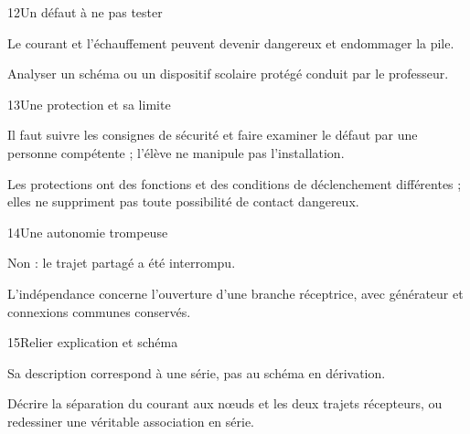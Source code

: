 \par\noindent\begin{minipage}{\linewidth}
\begin{corrige}{12}{Un défaut à ne pas tester}
\begin{questions}
\item Le courant et l’échauffement peuvent devenir dangereux et endommager la pile.
\item Analyser un schéma ou un dispositif scolaire protégé conduit par le professeur.
\end{questions}
\end{corrige}
\end{minipage}
\par\noindent\begin{minipage}{\linewidth}
\begin{corrige}{13}{Une protection et sa limite}
\begin{questions}
\item Il faut suivre les consignes de sécurité et faire examiner le défaut par une personne compétente ; l’élève ne manipule pas l’installation.
\item Les protections ont des fonctions et des conditions de déclenchement différentes ; elles ne suppriment pas toute possibilité de contact dangereux.
\end{questions}
\end{corrige}
\end{minipage}
\par\noindent\begin{minipage}{\linewidth}
\begin{corrige}{14}{Une autonomie trompeuse}
\begin{questions}
\item Non : le trajet partagé a été interrompu.
\item L’indépendance concerne l’ouverture d’une branche réceptrice, avec générateur et connexions communes conservés.
\end{questions}
\end{corrige}
\end{minipage}
\par\noindent\begin{minipage}{\linewidth}
\begin{corrige}{15}{Relier explication et schéma}
\begin{questions}
\item Sa description correspond à une série, pas au schéma en dérivation.
\item Décrire la séparation du courant aux nœuds et les deux trajets récepteurs, ou redessiner une véritable association en série.
\end{questions}
\end{corrige}
\end{minipage}
